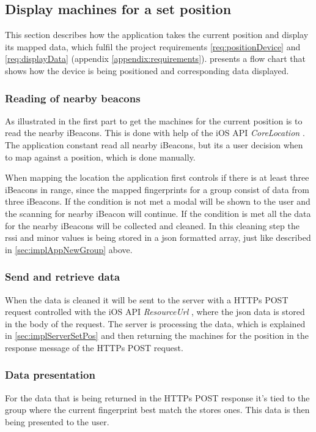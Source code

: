 \subsection{Display machines for a set position}\label{sec:implAppSetPos}
This section describes how the application takes the current position and display its mapped data, which fulfil the project requirements \ref{req:positionDevice} and \ref{req:displayData} (appendix \ref{appendix:requirements}).
 presents a flow chart that shows how the device is being positioned and corresponding data displayed.



\subsubsection{Reading of nearby beacons}\label{sec:implAppSetPosReadBeacons}
As illustrated in  the first part to get the machines for the current position is to read the nearby iBeacons.
This is done with help of the iOS API \textit{CoreLocation} \cite{CoreLocationApple}.
The application constant read all nearby iBeacons, but its a user decision when to map against a position, which is done manually.

\bigskip

When mapping the location the application first controls if there is at least three iBeacons in range, since the mapped fingerprints for a group consist of data from three iBeacons.
If the condition is not met a modal will be shown to the user and the scanning for nearby iBeacon will continue.
If the condition is met all the data for the nearby iBeacons will be collected and cleaned.
In this cleaning step the \acrshort{rssi} and minor values is being stored in a \acrshort{json} formatted array, just like  described in \cref{sec:implAppNewGroup} above.


\subsubsection{Send and retrieve data}\label{sec:implAppSetPosSendRetreiveData}
When the data is cleaned it will be sent to the server with a HTTPs POST request controlled with the iOS API \textit{ResourceUrl} \cite{ResourceURLAppleDeveloper}, where the \acrshort{json} data is stored in the body of the request.
The server is processing the data, which is explained in \cref{sec:implServerSetPos} and then returning the machines for the position in the response message of the HTTPs POST request.


\subsubsection{Data presentation}\label{sec:implAppSetPosShowData}
For the data that is being returned in the HTTPs POST response it's tied to the group where the current fingerprint best match the stores ones.
This data is then being presented to the user.
